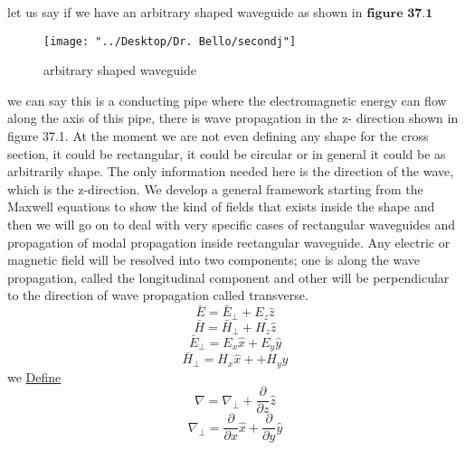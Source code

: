 let us say if we have an arbitrary shaped waveguide as shown in $ \textbf{figure 37.1} $
\begin{figure}
	\centering
	\texttt{[image: "../Desktop/Dr. Bello/secondj"]}
	\caption{arbitrary shaped waveguide}
	\label{fig:second}
\end{figure}

we can say this is a conducting pipe where the electromagnetic energy can flow along the axis of this pipe, there is wave propagation in the z- direction shown in figure 37.1. 
At the moment we are not even defining any shape for the cross section, it could be rectangular, it could be circular or in general it could be as arbitrarily shape. The only information needed here is the direction of the wave, which is the z-direction. We develop a general framework starting from the Maxwell equations to show the kind of fields that exists inside the shape and then we will go on to deal with very specific cases of rectangular waveguides and propagation of modal propagation inside rectangular waveguide. Any electric or magnetic field will be resolved into two components; one is along the wave propagation, called the longitudinal component and other will be perpendicular to the direction of wave propagation called transverse.
\begin{equation*}
\bar{E} = \bar{E}_\bot + E_z\hat{z}
\end{equation*}
\begin{equation*}
\bar{H} = \bar{H}_\bot + H_z\hat{z}
\end{equation*}
\begin{equation*}
\bar{E}_\bot = E_x\hat{x} + E_y\hat{y}
\end{equation*}
\begin{equation*}
\bar{H}_\bot = H_x\hat{x} + + H_y\hat{y}
\end{equation*}
we \underline{Define}
\begin{equation}
\nabla = \nabla_\bot + \frac{\partial}{\partial z}\hat{z}
\end{equation}
\begin{equation}
\nabla_\bot = \frac{\partial}{\partial x}\hat{x} + \frac{\partial}{\partial y}\hat{y}
\end{equation}

